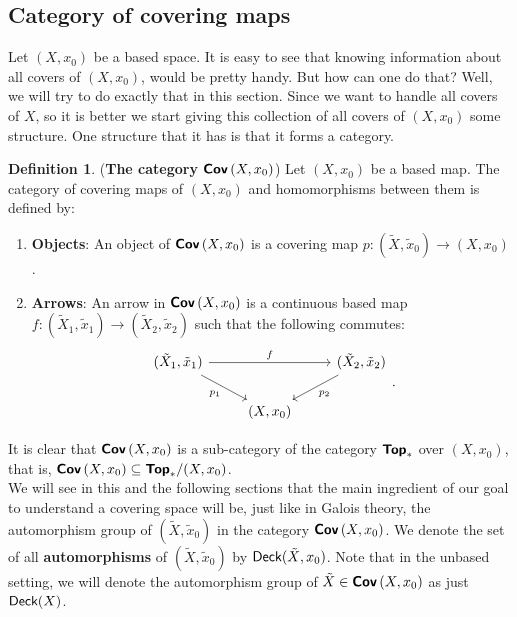 \documentclass[letterpaper,11pt,twoside]{article}
\theoremstyle{definition}
\theoremstyle{definition}
\newtheorem{definition}[proposition]{Definition}
\theoremstyle{definition}
\theoremstyle{definition}
\theoremstyle{definition}
\theoremstyle{definition}
\theoremstyle{remark}
\theoremstyle{definition}
\newcommand{\cat}[1]{{\fontfamily{lmss}\selectfont 
		\text{\textbf{#1}}
}}
\newcommand{\Cov}[1]{\cat{Cov}\left (#1\right )}
\newcommand{\Deck}[1]{{\fontfamily{lmss}\selectfont 
		\text{Deck}(#1)
}}
\begin{document}
\subsection{Category of covering maps}
Let $ (X,x_{0})$ be a based space. It is easy to see that knowing information about all covers of $ (X,x_{0}) $, would be pretty handy. But how can one do that? Well, we will try to do exactly that in this section. Since we want to handle all covers of $ X $, so it is better we start giving this collection of all covers of $ (X,x_{0}) $ some structure. One structure that it has is that it forms a category.
\begin{definition}\label{D-6.1.1}
	(\textbf{The category $ \Cov{X,x_0} $})	Let $ (X,x_0) $ be a based map. The category of covering maps of $ (X,x_0) $ and homomorphisms between them is defined by:
	\begin{enumerate}
		\item {\textbf{Objects}: An object of $ \Cov{X,x_0} $ is a covering map $ p : (\tilde{X},\tilde{x}_0) \to (X,x_0)$.}
		\item {\textbf{Arrows}: An arrow in $ \Cov{X,x_0} $ is a continuous based map $ f : (\tilde{X}_1,\tilde{x}_1) \to (\tilde{X}_2,\tilde{x}_2)$ such that the following commutes:
	\[\begin{tikzcd}
		{(\tilde{X}_1,\tilde{x}_1)} && {(\tilde{X}_2,\tilde{x}_2)} \\
		& {(X,x_0)}
		\arrow["{p_1}"', from=1-1, to=2-2]
		\arrow["{p_2}", from=1-3, to=2-2]
		\arrow["f", from=1-1, to=1-3]
	\end{tikzcd}.\]	
	}
	\end{enumerate}
\end{definition}
It is clear that $ \Cov{X,x_0} $ is a sub-category of the category $ \cat{Top}_* $ over $ (X,x_0) $, that is, $ \Cov{X,x_0} \subseteq \cat{Top}_*/(X,x_0) $. \\

We will see in this and the following sections that the main ingredient of our goal to understand a covering space will be, just like in Galois theory, the automorphism group of $ (\tilde{X},\tilde{x}_0) $ in the category $ \Cov{X,x_0} $. We denote the set of all \textbf{automorphisms} of $ (\tilde{X},\tilde{x}_0) $ by $ \Deck{\tilde{X},x_0} $. Note that in the unbased setting, we will denote the automorphism group of $ \tilde{X} \in \Cov{X,x_0}$ as just $ \Deck{X} $. \\
\end{document}
